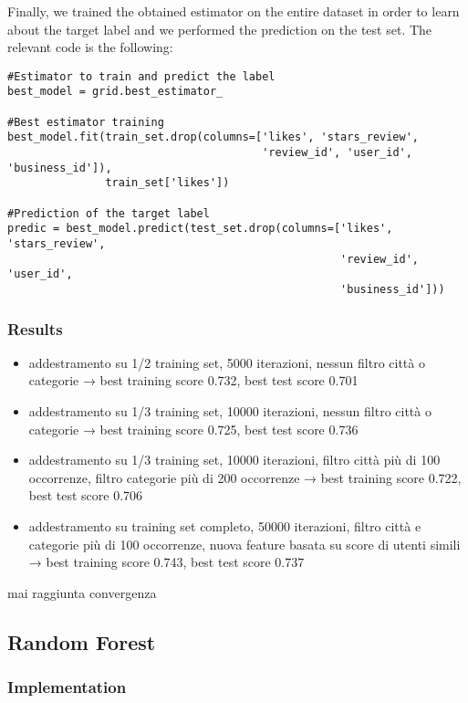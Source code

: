 Finally, we trained the obtained estimator on the entire dataset in order to learn about the target label and we performed the prediction on the test set. The relevant code is the following:

\begin{lstlisting}[caption={Linear SVM training and predictions},label={lst:svm-fit}]
#Estimator to train and predict the label
best_model = grid.best_estimator_

#Best estimator training
best_model.fit(train_set.drop(columns=['likes', 'stars_review',
                                       'review_id', 'user_id', 'business_id']),
               train_set['likes'])

#Prediction of the target label
predic = best_model.predict(test_set.drop(columns=['likes', 'stars_review',
                                                   'review_id', 'user_id', 
                                                   'business_id']))
\end{lstlisting}

\subsubsection{Results}

\begin{itemize}
    \item addestramento su 1/2 training set, 5000 iterazioni, nessun filtro città o categorie → best training score 0.732, best test score 0.701
    \item addestramento su 1/3 training set, 10000 iterazioni, nessun filtro città o categorie → best training score 0.725, best test score 0.736
    \item addestramento su 1/3 training set, 10000 iterazioni, filtro città più di 100 occorrenze, filtro categorie più di 200 occorrenze → best training score 0.722, best test score 0.706
    \item addestramento su training set completo, 50000 iterazioni, filtro città e categorie più di 100 occorrenze, nuova feature basata su score di utenti simili → best training score 0.743, best test score 0.737
\end{itemize}
mai raggiunta convergenza


\subsection{Random Forest}

\subsubsection{Implementation}

